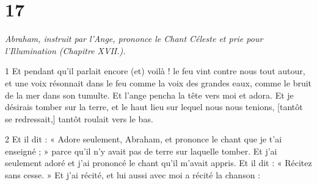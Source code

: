 \chapter{17}

\par \textit{Abraham, instruit par l'Ange, prononce le Chant Céleste et prie pour l'Illumination (Chapitre XVII.).}

\par 1 Et pendant qu'il parlait encore (et) voilà ! le feu vint contre nous tout autour, et une voix résonnait dans le feu comme la voix des grandes eaux, comme le bruit de la mer dans son tumulte. Et l'ange pencha la tête vers moi et adora. Et je désirais tomber sur la terre, et le haut lieu sur lequel nous nous tenions, [tantôt se redressait,] tantôt roulait vers le bas.

\par 2 Et il dit : « Adore seulement, Abraham, et prononce le chant que je t'ai enseigné ; » parce qu'il n'y avait pas de terre sur laquelle tomber. Et j'ai seulement adoré et j'ai prononcé le chant qu'il m'avait appris. Et il dit : « Récitez sans cesse. » Et j'ai récité, et lui aussi avec moi a récité la chanson :

